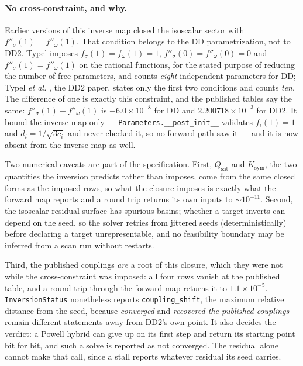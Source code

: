 \documentclass[aps,prc,onecolumn,superscriptaddress,nofootinbib,10pt]{revtex4-2}
\begin{document}
\paragraph{No cross-constraint, and why.} Earlier versions of this inverse
map closed the isoscalar sector with $f''_\sigma(1) = f''_\omega(1)$. That
condition belongs to the DD parametrization, not to DD2. Typel
\cite{Typel2005} imposes $f_\sigma(1) = f_\omega(1) = 1$,
$f''_\sigma(0) = f''_\omega(0) = 0$ and $f''_\sigma(1) = f''_\omega(1)$ on
the rational functions, for the stated purpose of reducing the number of free
parameters, and counts \emph{eight} independent parameters for DD; Typel
\emph{et al.} \cite{Typel2010}, the DD2 paper, states only the first two
conditions and counts \emph{ten}. The difference of one is exactly this
constraint, and the published tables say the same:
$f''_\sigma(1) - f''_\omega(1)$ is $-6.0\times 10^{-8}$ for DD and
$2.200718\times 10^{-3}$ for DD2. It bound the inverse map only ---
\texttt{Parameters.\_\_post\_init\_\_} validates $f_i(1) = 1$ and
$d_i = 1/\sqrt{3 c_i}$ and never checked it, so no forward path saw it --- and
it is now absent from the inverse map as well.

Two numerical caveats are part of the specification. First,
$Q_{\mathrm{sat}}$ and $K_{\mathrm{sym}}$, the two quantities the inversion
predicts rather than imposes, come from the same closed forms as the imposed
rows, so what the closure imposes is exactly what the forward map reports and
a round trip returns its own inputs to $\sim 10^{-11}$. Second, the isoscalar residual surface has spurious basins;
whether a target inverts can depend on the seed, so the solver retries from
jittered seeds (deterministically) before declaring a target unrepresentable,
and no feasibility boundary may be inferred from a scan run without restarts.

Third, the published couplings \emph{are} a root of this closure, which
they were not while the cross-constraint was imposed: all four rows vanish at
the published table, and a round trip through the forward map returns it to
$1.1\times 10^{-5}$. \texttt{InversionStatus} nonetheless reports
\texttt{coupling\_shift}, the maximum relative distance from the seed,
because \emph{converged} and \emph{recovered the published couplings} remain
different statements away from DD2's own point. It also decides the verdict: a
Powell hybrid can give up on its first step and return its starting point bit
for bit, and such a solve is reported as not converged. The residual alone
cannot make that call, since a stall reports whatever residual its seed
carries.
\end{document}
